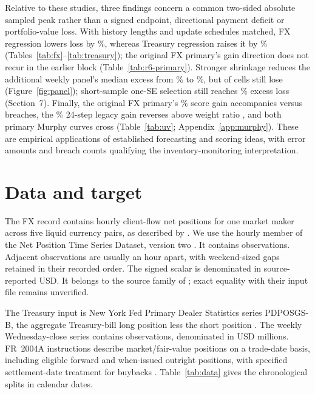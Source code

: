 Relative to these studies, three findings concern a common two-sided absolute sampled peak rather than a signed endpoint, directional payment deficit or portfolio-value loss. With history lengths and update schedules matched, FX regression lowers loss by \FXMatchedGain{}\%, whereas Treasury regression raises it by \TreasuryOriginalExcess{}\% (Tables~\ref{tab:fx}--\ref{tab:treasury}); the original FX primary's gain direction does not recur in the earlier block (Table~\ref{tab:r6-primary}). Stronger shrinkage reduces the additional weekly panel's median excess from \PanelOriginalMedian{}\% to \PanelExpandedMedian{}\%, but \PanelExpandedLosses{} of \PanelCellCount{} cells still lose (Figure~\ref{fig:panel}); short-sample one-SE selection still reaches \RWeeklyTwoWorst{}\% excess loss (Section~7). Finally, the original FX primary's \FXPrimaryGain{}\% score gain accompanies \FXPrimaryBreaches{} versus \FXReferenceBreaches{} breaches, the \FXLegacyGain{}\% 24-step legacy gain reverses above weight ratio \FXLegacyCrossing{}, and both primary Murphy curves cross (Table~\ref{tab:uv}; Appendix~\ref{app:murphy}). These are empirical applications of established forecasting and scoring ideas, with error amounts and breach counts qualifying the inventory-monitoring interpretation.

\section{Data and target}
The FX record contains hourly client-flow net positions for one market maker across five liquid currency pairs, as described by \citet{wisniewski2020}. We use the hourly member of the Net Position Time Series Dataset, version two \citep{dataset}. It contains \FXObservationCount{} observations. Adjacent observations are usually an hour apart, with weekend-sized gaps retained in their recorded order. The signed scalar is denominated in source-reported USD. It belongs to the source family of \citet{wisniewski2020}; exact equality with their input file remains unverified.

The Treasury input is New York Fed Primary Dealer Statistics series PDPOSGS-B, the aggregate Treasury-bill long position less the short position \citep{nyfeddata}. The weekly Wednesday-close series contains \TreasuryObservationCount{} observations, denominated in USD millions. FR~2004A instructions describe market/fair-value positions on a trade-date basis, including eligible forward and when-issued outright positions, with specified settlement-date treatment for buybacks \citep{fr2004}. Table~\ref{tab:data} gives the chronological splits in calendar dates.

